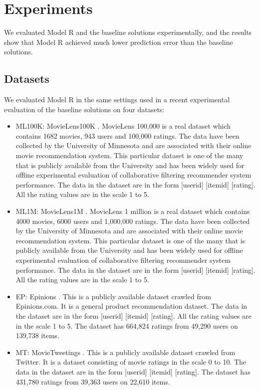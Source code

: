 \documentclass[12pt]{WSUThesis}
\theoremstyle{definition}
\begin{document}
\section{Experiments}
We evaluated Model R and the baseline solutions experimentally,
and the results show that Model R achieved much lower prediction error than 
the baseline solutions.

\subsection{Datasets}
\label{datasets}
We evaluated Model R in the same settings used in a recent experimental 
evaluation of the baseline solutions \cite{polatidis2016multi} on four datasets:
\begin{itemize}
	\item ML100K: MovieLens100K \cite{harper2015movielens}. MovieLens 100,000 is a real dataset which contains 1682 movies, 943 users and 100,000 ratings. The data have been collected by the University of Minnesota and are associated with their online movie recommendation system. This particular dataset is one of the many that is publicly available from the University and has been widely used for offline experimental evaluation of collaborative filtering recommender system performance. The data in the dataset are in the form [userid] [itemid] [rating]. All the rating values are in the scale 1 to 5.
	\item ML1M: MovieLens1M \cite{harper2015movielens}. MovieLens 1 million is a real dataset which contains 4000 movies, 6000 users and 1,000,000 ratings. The data have been collected by the University of Minnesota and are associated with their online movie recommendation system. This particular dataset is one of the many that is publicly available from the University and has been widely used for offline experimental evaluation of collaborative filtering recommender system performance. The data in the dataset are in the form [userid] [itemid] [rating]. All the rating values are in the scale 1 to 5.
	\item EP: Epinions \cite{massa2007trust}. This is a publicly available dataset crawled from Epinions.com. It is a general product recommendation dataset. The data in the dataset are in the form [userid] [itemid] [rating]. All the rating values are in the scale 1 to 5. The dataset has 664,824 ratings from 49,290 users on 139,738 items.
	\item MT: MovieTweetings \cite{dooms2013movietweetings}. This is a publicly available dataset crawled from Twitter. It is a dataset consisting of movie ratings in the scale 0 to 10. The data in the dataset are in the form [userid] [itemid] [rating]. The dataset has 431,780 ratings from 39,363 users on 22,610 items.
\end{itemize}
\end{document}
